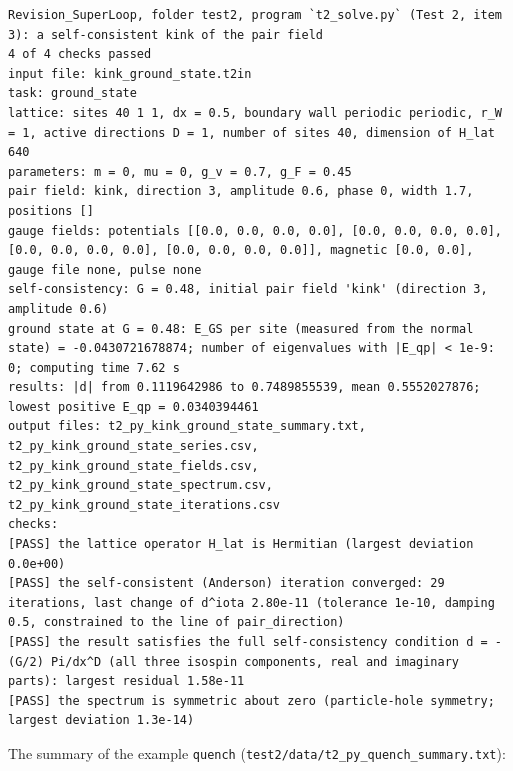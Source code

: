 \documentclass[
  10pt,
]{article}
\begin{document}
\begin{verbatim}
Revision_SuperLoop, folder test2, program `t2_solve.py` (Test 2, item 3): a self-consistent kink of the pair field
4 of 4 checks passed
input file: kink_ground_state.t2in
task: ground_state
lattice: sites 40 1 1, dx = 0.5, boundary wall periodic periodic, r_W = 1, active directions D = 1, number of sites 40, dimension of H_lat 640
parameters: m = 0, mu = 0, g_v = 0.7, g_F = 0.45
pair field: kink, direction 3, amplitude 0.6, phase 0, width 1.7, positions []
gauge fields: potentials [[0.0, 0.0, 0.0, 0.0], [0.0, 0.0, 0.0, 0.0], [0.0, 0.0, 0.0, 0.0], [0.0, 0.0, 0.0, 0.0]], magnetic [0.0, 0.0], gauge file none, pulse none
self-consistency: G = 0.48, initial pair field 'kink' (direction 3, amplitude 0.6)
ground state at G = 0.48: E_GS per site (measured from the normal state) = -0.0430721678874; number of eigenvalues with |E_qp| < 1e-9: 0; computing time 7.62 s
results: |d| from 0.1119642986 to 0.7489855539, mean 0.5552027876; lowest positive E_qp = 0.0340394461
output files: t2_py_kink_ground_state_summary.txt, t2_py_kink_ground_state_series.csv, t2_py_kink_ground_state_fields.csv, t2_py_kink_ground_state_spectrum.csv, t2_py_kink_ground_state_iterations.csv
checks:
[PASS] the lattice operator H_lat is Hermitian (largest deviation 0.0e+00)
[PASS] the self-consistent (Anderson) iteration converged: 29 iterations, last change of d^iota 2.80e-11 (tolerance 1e-10, damping 0.5, constrained to the line of pair_direction)
[PASS] the result satisfies the full self-consistency condition d = -(G/2) Pi/dx^D (all three isospin components, real and imaginary parts): largest residual 1.58e-11
[PASS] the spectrum is symmetric about zero (particle-hole symmetry; largest deviation 1.3e-14)
\end{verbatim}

The summary of the example \texttt{quench}
(\texttt{test2/data/t2\_py\_quench\_summary.txt}):
\end{document}
